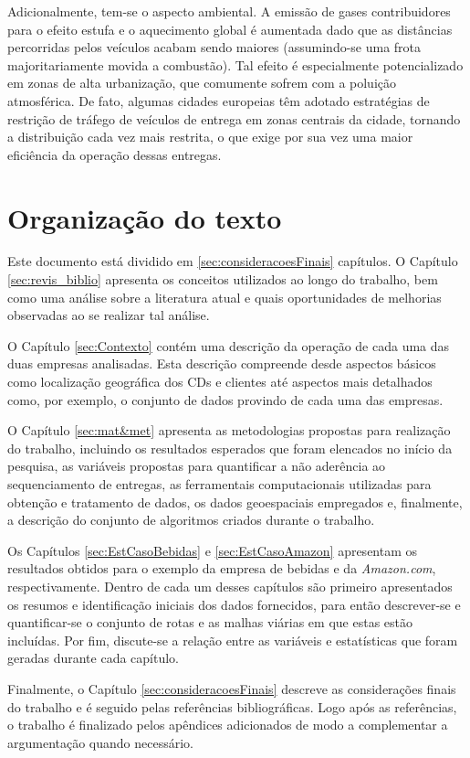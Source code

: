 Adicionalmente, tem-se o aspecto ambiental.
A emissão de gases contribuidores para o efeito estufa e o aquecimento global é aumentada dado que as distâncias percorridas pelos veículos acabam sendo maiores (assumindo-se uma frota majoritariamente movida a combustão).
Tal efeito é especialmente potencializado em zonas de alta urbanização, que comumente sofrem com a poluição atmosférica.
De fato, algumas cidades europeias têm adotado estratégias de restrição de tráfego de veículos de entrega em zonas centrais da cidade, tornando a distribuição cada vez mais restrita, o que exige por sua vez uma maior eficiência da operação dessas entregas.

\section{Organização do texto}

Este documento está dividido em \ref{sec:consideracoesFinais} capítulos.
O Capítulo \ref{sec:revis_biblio} apresenta os conceitos utilizados ao longo do trabalho, bem como uma análise sobre a literatura atual e quais oportunidades de melhorias observadas ao se realizar tal análise.

O Capítulo \ref{sec:Contexto} contém uma descrição da operação de cada uma das duas empresas analisadas.
Esta descrição compreende desde aspectos básicos como localização geográfica dos CDs e clientes até aspectos mais detalhados como, por exemplo, o conjunto de dados provindo de cada uma das empresas.

O Capítulo \ref{sec:mat&met} apresenta as metodologias propostas para realização do trabalho, incluindo os resultados esperados que foram elencados no início da pesquisa, as variáveis propostas para quantificar a não aderência ao sequenciamento de entregas, as ferramentais computacionais utilizadas para obtenção e tratamento de dados, os dados geoespaciais empregados e, finalmente, a descrição do conjunto de algoritmos criados durante o trabalho.

Os Capítulos \ref{sec:EstCasoBebidas} e \ref{sec:EstCasoAmazon}  apresentam os resultados obtidos para o exemplo da empresa de bebidas e da \textit{Amazon.com}, respectivamente.
Dentro de cada um desses capítulos são primeiro apresentados os resumos e identificação iniciais dos dados fornecidos, para então descrever-se e quantificar-se o conjunto de rotas e as malhas viárias em que estas estão incluídas. 
Por fim, discute-se a relação entre as variáveis e estatísticas que foram geradas durante cada capítulo.

Finalmente, o Capítulo \ref{sec:consideracoesFinais} descreve as considerações finais do trabalho e é seguido pelas referências bibliográficas.
Logo após as referências, o trabalho é finalizado pelos apêndices adicionados de modo a complementar a argumentação quando necessário.
